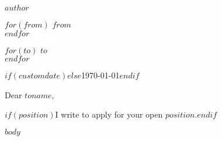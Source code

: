 \documentclass[$fontsize$, letterpaper]{article}
\begin{document}
\small
\begin{center}
{\Large \textsc{$author$}} \\
\end{center}

$for(from)$
$from$ \\
$endfor$

\vspace{1em}

$for(to)$
$to$ \\
$endfor$

\vspace{1em}

$if(customdate)$$else$\today$endif$

\vspace{1em}

Dear $toname$,

$if(position)$I write to apply for your open $position$.$endif$

$body$
\end{document}
